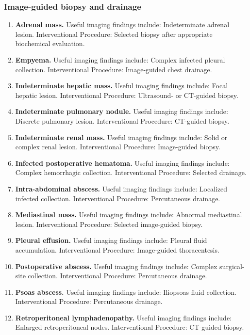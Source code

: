 \subsubsection{Image-guided biopsy and drainage}
\begin{enumerate}[leftmargin=*,itemsep=0.45em,topsep=0.4em]
\item \textbf{Adrenal mass.} Useful imaging findings include: Indeterminate adrenal lesion. Interventional Procedure: Selected biopsy after appropriate biochemical evaluation.
\item \textbf{Empyema.} Useful imaging findings include: Complex infected pleural collection. Interventional Procedure: Image-guided chest drainage.
\item \textbf{Indeterminate hepatic mass.} Useful imaging findings include: Focal hepatic lesion. Interventional Procedure: Ultrasound- or CT-guided biopsy.
\item \textbf{Indeterminate pulmonary nodule.} Useful imaging findings include: Discrete pulmonary lesion. Interventional Procedure: CT-guided biopsy.
\item \textbf{Indeterminate renal mass.} Useful imaging findings include: Solid or complex renal lesion. Interventional Procedure: Image-guided biopsy.
\item \textbf{Infected postoperative hematoma.} Useful imaging findings include: Complex hemorrhagic collection. Interventional Procedure: Selected drainage.
\item \textbf{Intra-abdominal abscess.} Useful imaging findings include: Localized infected collection. Interventional Procedure: Percutaneous drainage.
\item \textbf{Mediastinal mass.} Useful imaging findings include: Abnormal mediastinal lesion. Interventional Procedure: Selected image-guided biopsy.
\item \textbf{Pleural effusion.} Useful imaging findings include: Pleural fluid accumulation. Interventional Procedure: Image-guided thoracentesis.
\item \textbf{Postoperative abscess.} Useful imaging findings include: Complex surgical-site collection. Interventional Procedure: Percutaneous drainage.
\item \textbf{Psoas abscess.} Useful imaging findings include: Iliopsoas fluid collection. Interventional Procedure: Percutaneous drainage.
\item \textbf{Retroperitoneal lymphadenopathy.} Useful imaging findings include: Enlarged retroperitoneal nodes. Interventional Procedure: CT-guided biopsy.
\end{enumerate}

